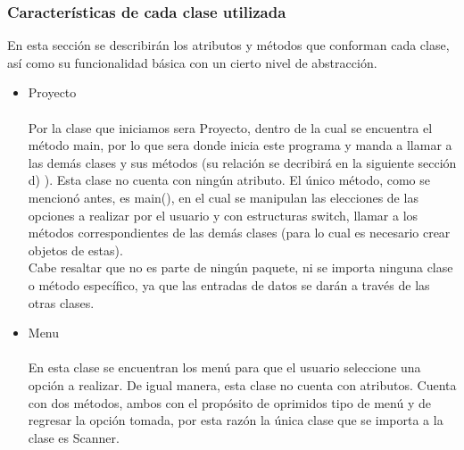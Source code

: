 \documentclass[12pt]{report}
\begin{document}
\subsubsection{Características de cada clase utilizada}
En esta sección se describirán los atributos y métodos que conforman cada clase, así como su funcionalidad básica con un cierto nivel de abstracción.
\begin{itemize}
\item Proyecto \\ \\
Por la clase que iniciamos sera Proyecto, dentro de la cual se encuentra el método main, por lo que sera donde inicia este programa y manda a llamar a las demás clases y sus métodos (su relación se decribirá en la siguiente sección d) ). Esta clase no cuenta con ningún atributo. El único método, como se mencionó antes, es main(), en el cual se manipulan las elecciones de las opciones a realizar por el usuario y con estructuras switch, llamar a los métodos correspondientes de las demás clases (para lo cual es necesario crear objetos de estas).\\
Cabe resaltar que no es parte de ningún paquete, ni se importa ninguna clase o método específico, ya que las entradas de datos se darán a través de las otras clases.\\

\item Menu \\ \\
En esta clase se encuentran los menú para que el usuario seleccione una opción a realizar. De igual manera, esta clase no cuenta con atributos. Cuenta con dos métodos, ambos con el propósito de oprimidos tipo de menú y de regresar la opción tomada, por esta razón la única clase que se importa a la clase es Scanner.\\




\end{itemize}
\end{document}
